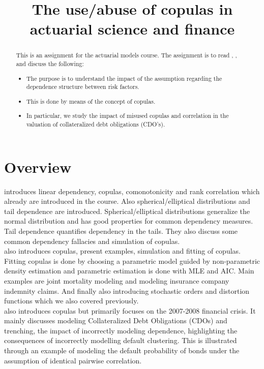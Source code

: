 \documentclass[a4paper,12pt]{article}
\title{The use/abuse of copulas in actuarial science and finance}
\date{}
\begin{document}
\maketitle

\begin{abstract}
    This is an assignment for the actuarial models course.
    The assignment is to read \cite{dempster_correlation_2002}, \cite{frees_understanding_1998},
    \cite{donnelly_devil_nodate} and discuss the following:

    \begin{itemize}
        \item  The purpose is to understand the impact of the assumption regarding
              the dependence structure between risk factors.
        \item  This is done by means of the concept of copulas.
        \item  In particular, we study the impact of misused copulas and correlation in the
              valuation of collateralized debt obligations (CDO's).
    \end{itemize}

\end{abstract}

\section{Overview}
\cite{dempster_correlation_2002} introduces linear dependency, copulas, comonotonicity and rank correlation which
already are introduced in the course. Also spherical/elliptical distributions and tail dependence are introduced.
Spherical/elliptical distributions generalize the normal distribution and has good properties for common dependency
measures.  Tail dependence quantifies dependency in the tails. They also discuss some
common dependency fallacies and simulation of copulas.\\

\cite{frees_understanding_1998} also introduces copulas, present examples, simulation
and fitting of copulas. Fitting copulas is done by choosing a parametric model
guided by non-parametric density estimation and parametric estimation is done
with MLE and AIC.
Main examples are joint mortality modeling and modeling insurance company indemnity claims.
And finally also introducing stochastic orders and distortion functions which we also covered previously. \\

\cite{donnelly_devil_nodate} also introduces copulas but primarily focuses on the 2007-2008 financial crisis.
It mainly discusses modeling Collateralized Debt Obligations (CDOs) and trenching, the impact of
incorrectly modeling dependence, highlighting the consequences of incorrectly modelling default clustering.
This is illustrated through an example of modeling the default probability of bonds under the assumption
of identical pairwise correlation. \\
\end{document}
